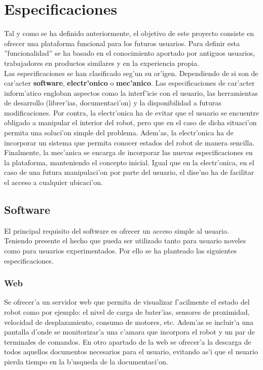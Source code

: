 \documentclass[twoside,12pt]{article}
\begin{document}
\section{Especificaciones}
Tal y como se ha definido anteriormente, el objetivo de este proyecto consiste en ofrecer una plataforma funcional para los futuros usuarios. Para definir esta ''funcionalidad'' se ha basado en el conocimiento aportado por antiguos usuarios, trabajadores en productos similares y en la experiencia propia. \\

Las especificaciones se han clasificado seg'un su or'igen. Dependiendo de si son de car'acter \textbf{software}, \textbf{electr'onico} o \textbf{mec'anico}. Las especificaciones de car'acter inform'atico engloban aspectos como la interf'icie con el usuario, las herramientas de desarrollo (librer'ias, documentaci'on) y la disponibilidad a futuras modificaciones. Por contra, la electr'onica ha de evitar que el usuario se encuentre obligado a manipular el interior del robot, pero que en el caso de dicha situaci'on permita una soluci'on simple del problema. Adem'as, la electr'onica ha de incorporar un sistema que permita conocer estados del robot de manera sencilla. Finalmente, la mec'anica se encarga de incorporar las nuevas especificaciones en la plataforma, manteniendo el concepto inicial. Igual que en la electr'onica, en el caso de una futura manipulaci'on por parte del usuario, el dise'no ha de facilitar el acceso a cualquier ubicaci'on.

\subsection{Software}
El principal requisito del software es ofrecer un acceso simple al usuario. Teniendo presente el hecho que pueda ser utilizado tanto para usuario noveles como para usuarios experimentados. Por ello se ha planteado las siguientes especificaciones.

\subsubsection{Web}
Se ofrecer'a un servidor web que permita de visualizar f'acilmente el estado del robot como por ejemplo: el nivel de carga de bater'ias, sensores de proximidad, velocidad de desplazamiento, consumo de motores, etc. Adem'as se incluir'a una pantalla d'onde se monitorizar'a una c'amara que incorpora el robot y un par de terminales de comandos.
En otro apartado de la web se ofrecer'a la descarga de todos aquellos documentos necesarios para el usuario, evitando as'i que el usuario pierda tiempo en la b'usqueda de la documentaci'on.
\end{document}
